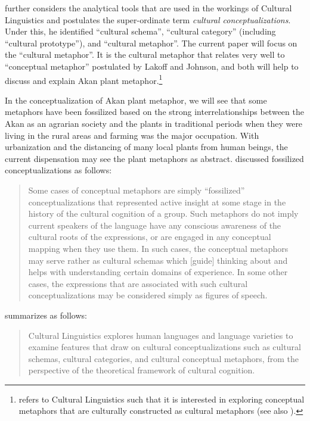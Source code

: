 \documentclass[output=paper,colorlinks,citecolor=brown]{langscibook}
\begin{document}
\citet[477]{Sharifian2015} further considers the analytical tools that are used in the workings of Cultural Linguistics and postulates the super-ordinate term \textit{cultural conceptualizations}. Under this, he identified ``cultural schema'', ``cultural category” (including ``cultural prototype”), and ``cultural metaphor''. The current paper will focus on the ``cultural metaphor''. It is the cultural metaphor that relates very well to ``conceptual metaphor” postulated by Lakoff and Johnson, and both will help to discuss and explain Akan plant metaphor.\footnote{\citet[482]{Sharifian2015} refers to Cultural Linguistics such that it is interested in exploring conceptual metaphors that are culturally constructed as cultural metaphors (see also \citealt{Sharifian2011}).} 

In the conceptualization of Akan plant metaphor, we will see that some meta\-phors have been fossilized based on the strong interrelationships between the Akan as an agrarian society and the plants in traditional periods when they were living in the rural areas and farming was the major occupation. With urbanization and the distancing of many local plants from human beings, the current dispensation may see the plant metaphors as abstract. \citet[482]{Sharifian2015} discussed fossilized conceptualizations as follows:

\begin{quote}
    Some cases of conceptual metaphors are simply “fossilized” conceptualizations that represented active insight at some stage in the history of the cultural cognition of a group. Such metaphors do not imply current speakers of the language have any conscious awareness of the cultural roots of the expressions, or are engaged in any conceptual mapping when they use them. In such cases, the conceptual metaphors may serve rather as cultural schemas which [guide] thinking about and helps with understanding certain domains of experience. In some other cases, the expressions that are associated with such cultural conceptualizations may be considered simply as figures of speech.
\end{quote}

\noindent \citet[482]{Sharifian2015} summarizes  as follows: 

\begin{quote}
    Cultural Linguistics explores human languages and language varieties to examine features that draw on cultural conceptualizations such as cultural schemas, cultural categories, and cultural conceptual metaphors, from the perspective of the theoretical framework of cultural cognition.
\end{quote}
\end{document}
